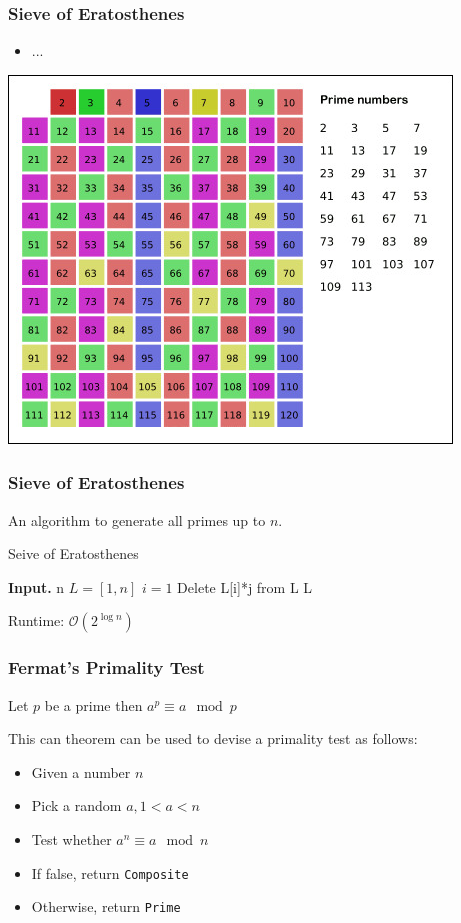 \documentclass[11pt]{beamer}
\newcommand{\bigo}{\mathcal{O}}
\begin{document}
\begin{frame}
\frametitle{Sieve of Eratosthenes}
\centering
\begin{itemize}
  \item ...
\end{itemize}
\includegraphics[scale=0.45]{resources/sieve-158.jpg}
\end{frame}

\begin{frame}
\frametitle{Sieve of Eratosthenes}
An algorithm to generate all primes up to $n$.
\begin{algorithm}[H]
\caption{Seive of Eratosthenes}\label{alg:cap}
\begin{algorithmic}[1]
  \State \textbf{Input.} n
  \State $L = [1, n]$
  \State $i = 1$
      \State Delete L[i]*j from L
    \EndFor
  \EndWhile
  \State \Return L
\end{algorithmic}
\end{algorithm}

Runtime: $\bigo(2^{\log n})$

\end{frame}

\begin{frame}
\frametitle{Fermat's Primality Test}
\begin{theorem}
  Let $p$ be a prime then $a^{p} \equiv a \mod p$
\end{theorem}
This can theorem can be used to devise a primality test as follows:
\begin{itemize}
  \item Given a number $n$
  \item Pick a random $a, 1 < a < n$
  \item Test whether $a^n \equiv a \mod n$
  \item If false, return \texttt{Composite}
  \item Otherwise, return \texttt{Prime}
\end{itemize}
\end{frame}
\end{document}
